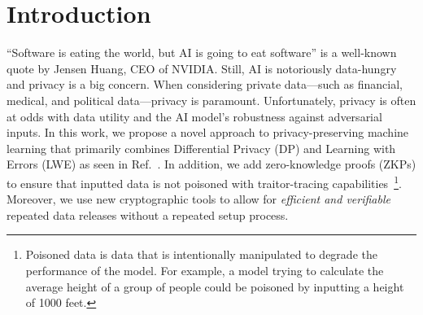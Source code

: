 \section{Introduction}
    ``Software is eating the world, but AI is going to eat software'' is a well-known quote by Jensen Huang, CEO of NVIDIA.
    Still, AI is notoriously data-hungry and privacy is a big concern.
    When considering private data---such as financial, medical, and political data---privacy is paramount.
    Unfortunately, privacy is often at odds with data utility and the AI model's robustness against adversarial inputs.
    In this work, we propose a novel approach to privacy-preserving machine learning that primarily combines Differential Privacy (DP) and Learning with Errors (LWE) as seen in Ref.~\cite{stevens2021efficientdifferentiallyprivatesecure}.
    In addition, we add zero-knowledge proofs (ZKPs) to ensure that inputted data is not poisoned with traitor-tracing capabilities~\footnote{Poisoned data is data that is intentionally manipulated to degrade the performance of the model.
    For example, a model trying to calculate the average height of a group of people could be poisoned by inputting a height of 1000 feet.}.
    Moreover, we use new cryptographic tools to allow for \emph{efficient and verifiable} repeated data releases without a repeated setup process.


